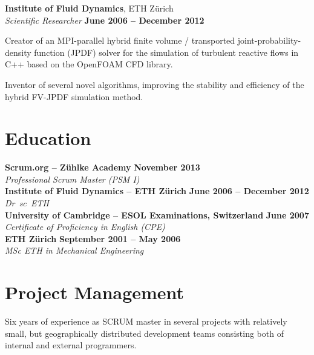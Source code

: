 \documentclass[line,11pt,a4paper]{../resume}
\begin{document}
\begin{resume}
\textbf{Institute of Fluid Dynamics}, ETH Z\"urich\\\vspace{1mm}%
\textsl{Scientific Researcher} \hfill \textbf{June 2006 -- December 2012}\\
\vspace{-4mm}%
\begin{list2}
  \item Creator of an MPI-parallel hybrid finite volume / transported
    joint-probability-density function (JPDF) solver for the simulation of
    turbulent reactive flows in C++ based on the OpenFOAM CFD library.

  \item Inventor of several novel algorithms, improving the stability and
    efficiency of the hybrid FV-JPDF simulation method.
\end{list2}

\pagebreak
\section{\mysidestyle Education}\vspace{2mm}

\textbf{Scrum.org -- Z\"uhlke Academy} \hfill \textbf{November 2013}\\
\vspace{1mm}%
\textsl{Professional Scrum Master (PSM I)}\\
\vspace{-1mm}%
%
\textbf{Institute of Fluid Dynamics -- ETH Z\"urich} \hfill \textbf{June 2006 -- December 2012}\\
\vspace{1mm}%
\textsl{Dr\ sc\ ETH}\\
\vspace{-1mm}%
%
\textbf{University of Cambridge -- ESOL Examinations, Switzerland} \hfill \textbf{June 2007}\\
\vspace{1mm}%
\textsl{Certificate of Proficiency in English (CPE)}\\
\vspace{-1mm}%
%
\textbf{ETH Z\"urich} \hfill \textbf{September 2001 -- May 2006}\\
\vspace{1mm}%
\textsl{MSc ETH in Mechanical Engineering}%
\vspace{-3mm}\\\vspace{-1mm}%

\section{\mysidestyle Project Management}\vspace{6mm}
\begin{list2}
  \item Six years of experience as SCRUM master in several projects with
    relatively small, but geographically distributed development teams
    consisting both of internal and external programmers.


\end{list2}
\end{resume}
\end{document}
